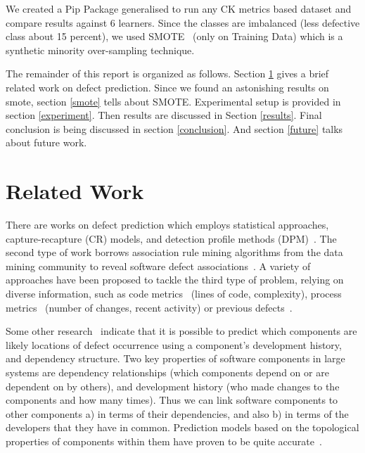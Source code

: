 \documentclass[conference]{IEEEtran}
\begin{document}
We created a Pip Package generalised to run any CK metrics based dataset and compare results against 6 learners. Since the classes are imbalanced (less defective class about 15 percent), we used SMOTE~\cite{chawla2002smote} (only on Training Data) which is a synthetic minority over-sampling technique.

The remainder of this report is organized as follows. Section \ref{review} gives a brief related work on defect prediction. Since we found an astonishing results on smote, section \ref{smote} tells about SMOTE. Experimental setup is provided in section \ref{experiment}. Then results are discussed in Section \ref{results}. Final conclusion is being discussed in section \ref{conclusion}. And section \ref{future} talks about future work.

\section{Related Work}
\label{review}

There are works on defect prediction which employs statistical approaches, capture-recapture (CR) models,
and detection profile methods (DPM)~\cite{song2011general}. The second type of work borrows association rule mining
algorithms from the data mining community to reveal software defect associations~\cite{song2006software}. A variety of approaches have been proposed to tackle the third type of problem, relying on diverse information, such as code metrics~\cite{nagappan2006mining,d2010extensive, hall2012systematic,radjenovic2013software,shepperd2014researcher} (lines of code, complexity), process metrics~\cite{hassan2009predicting} (number of changes, recent activity) or previous defects~\cite{kim2007predicting}.

Some other research~\cite{bird2009putting} indicate that it is possible to predict which components are likely locations of
defect occurrence using a component’s development history,
and dependency structure. Two key properties of software components
in large systems are dependency relationships (which components
depend on or are dependent on by others), and development
history (who made changes to the components and
how many times). Thus we can link software components
to other components a) in terms of their dependencies, and
also b) in terms of the developers that they have in common. Prediction models based on the topological properties
of components within them have proven to be quite
accurate~\cite{zimmermann2008predicting}.
\end{document}
